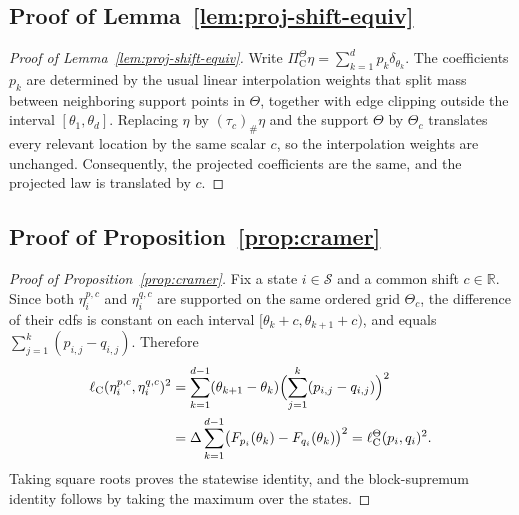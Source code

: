 \documentclass{article}
\newcommand{\X}{\mathcal{S}}
\newcommand{\R}{\mathbb{R}}
\begin{document}
\subsection{Proof of Lemma~\ref{lem:proj-shift-equiv}}
\begin{proof}[Proof of Lemma~\ref{lem:proj-shift-equiv}]
Write $\Pi^\Theta_{\mathrm C} \eta = \sum_{k=1}^d p_k \delta_{\theta_k}$. The coefficients $p_k$ are determined by the usual linear interpolation weights that split mass between neighboring support points in $\Theta$, together with edge clipping outside the interval $[\theta_1, \theta_d]$. Replacing $\eta$ by $(\tau_c)_\#\eta$ and the support $\Theta$ by $\Theta_c$ translates every relevant location by the same scalar $c$, so the interpolation weights are unchanged. Consequently, the projected coefficients are the same, and the projected law is translated by $c$.
\end{proof}

\subsection{Proof of Proposition~\ref{prop:cramer}}
\begin{proof}[Proof of Proposition~\ref{prop:cramer}]
Fix a state $i \in \X$ and a common shift $c \in \R$. Since both $\eta^{p, c}_i$ and $\eta^{q, c}_i$ are supported on the same ordered grid $\Theta_c$, the difference of their cdfs is constant on each interval $[\theta_k +c, \theta_{k+1} +c)$, and equals $\sum_{j=1}^k (p_{i, j} - q_{i,j})$. Therefore
\begin{equation}
\begin{aligned}
\ell_{\mathrm C}(\eta^{p, c}_i, \eta^{q, c}_i)^2 &= \sum_{k=1}^{d-1}(\theta_{k+1}-\theta_k)\Bigl(\sum_{j=1}^k(p_{i, j} - q_{i,j}) \Bigr)^2 \\
&=\Delta \sum_{k=1}^{d-1}\bigl(F_{p_i}(\theta_k) - F_{q_i}(\theta_k) \bigr)^2 = \ell^\Theta_{\mathrm C}(p_i, q_i)^2.
\end{aligned}
\end{equation}
Taking square roots proves the statewise identity, and the block-supremum identity follows by taking the maximum over the states.
\end{proof}
\end{document}
